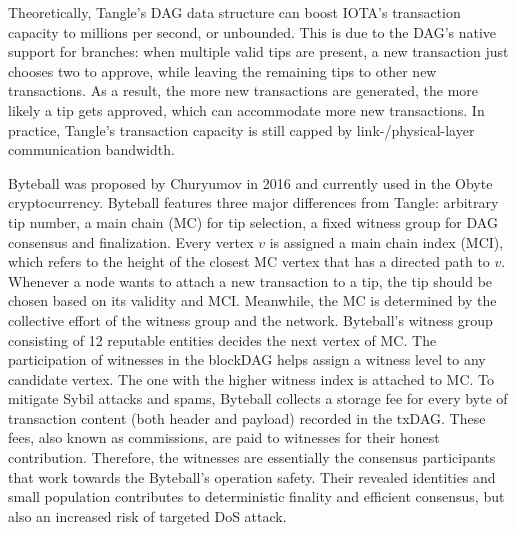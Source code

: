 Theoretically, Tangle's DAG data structure can boost IOTA's transaction capacity to millions per second, or unbounded. This is due to the DAG's native support for branches: when multiple valid tips are present, a new transaction just chooses two to approve, while leaving the remaining tips to other new transactions. As a result, the more new transactions are generated, the more likely a tip gets approved, which can accommodate more new transactions.
In practice, Tangle's transaction capacity is still capped by link-/physical-layer communication bandwidth.
{\color{\rcolor}

Byteball was proposed by Churyumov  in 2016 and currently used in the Obyte cryptocurrency. Byteball features three major differences from Tangle: arbitrary tip number, a main chain (MC) for tip selection, a fixed witness group for DAG consensus and finalization. Every vertex $v$ is assigned a main chain index (MCI), which refers to the height of the closest MC vertex that has a directed path to $v$. Whenever a node wants to attach a new transaction to a tip, the tip should be chosen based on its validity and MCI. Meanwhile, the MC is determined by the collective effort of the witness group and the network. Byteball's witness group consisting of 12 reputable entities decides the next vertex of MC. The participation of witnesses in the blockDAG helps assign a witness level to any candidate vertex. The one with the higher witness index is attached to MC.
To mitigate Sybil attacks and spams, Byteball collects a storage fee for every byte of transaction content (both header and payload) recorded in the txDAG. These fees, also known as commissions, are paid to witnesses for their honest contribution. Therefore, the witnesses are essentially the consensus participants that work towards the Byteball's operation safety. Their revealed identities and small population contributes to deterministic finality and efficient consensus, but also an increased risk of targeted DoS attack.

}
